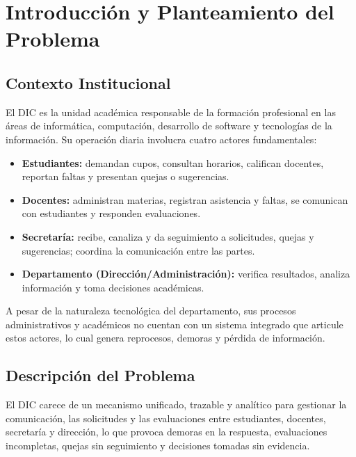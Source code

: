 \chapter{Introducción y Planteamiento del Problema}
\label{ch:introduccion}

\section{Contexto Institucional}

El \ac{DIC} es la unidad académica responsable de la formación profesional en las
áreas de informática, computación, desarrollo de software y tecnologías de la
información. Su operación diaria involucra cuatro actores fundamentales:

\begin{itemize}[leftmargin=1.4cm, itemsep=4pt]
  \item \textbf{Estudiantes:} demandan cupos, consultan horarios, califican
        docentes, reportan faltas y presentan quejas o sugerencias.
  \item \textbf{Docentes:} administran materias, registran asistencia y faltas,
        se comunican con estudiantes y responden evaluaciones.
  \item \textbf{Secretaría:} recibe, canaliza y da seguimiento a solicitudes,
        quejas y sugerencias; coordina la comunicación entre las partes.
  \item \textbf{Departamento (Dirección/Administración):} verifica resultados,
        analiza información y toma decisiones académicas.
\end{itemize}

A pesar de la naturaleza tecnológica del departamento, sus procesos
administrativos y académicos no cuentan con un sistema integrado que articule
estos actores, lo cual genera reprocesos, demoras y pérdida de información.

\section{Descripción del Problema}

\begin{cajaProblema}
El \ac{DIC} carece de un mecanismo unificado, trazable y analítico para gestionar
la comunicación, las solicitudes y las evaluaciones entre estudiantes, docentes,
secretaría y dirección, lo que provoca demoras en la respuesta, evaluaciones
incompletas, quejas sin seguimiento y decisiones tomadas sin evidencia.
\end{cajaProblema}

